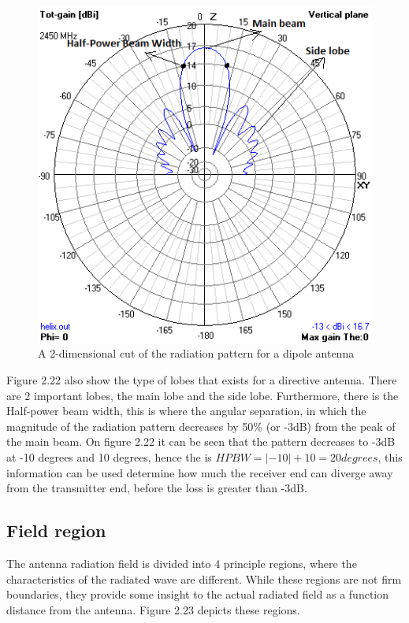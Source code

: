 \begin{figure}[h]
\centering
\includegraphics[scale=0.7]{figures/HelixVerticalrad.PNG}
\caption{A 2-dimensional cut of the radiation pattern for a dipole antenna }
\end{figure}

Figure 2.22 also show the type of lobes that exists for a directive antenna. There are 2 important lobes, the main lobe and the side lobe. Furthermore, there is the Half-power beam width, this is where the angular separation, in which the magnitude of the radiation pattern decreases by 50\% (or -3dB) from the peak of the main beam. On figure 2.22 it can be seen that the pattern decreases to -3dB at -10 degrees and 10 degrees, hence the is $HPBW = |-10|+10 =20 degrees$, this information can be used determine how much the receiver end can diverge away from the transmitter end, before the loss is greater than -3dB. 

\newpage

\subsection{Field region}
The antenna radiation field is divided into 4 principle regions, where the characteristics of the radiated wave are different. While these regions are not firm boundaries, they provide some insight to the actual radiated field as a function distance from the antenna. Figure 2.23 depicts these regions.

